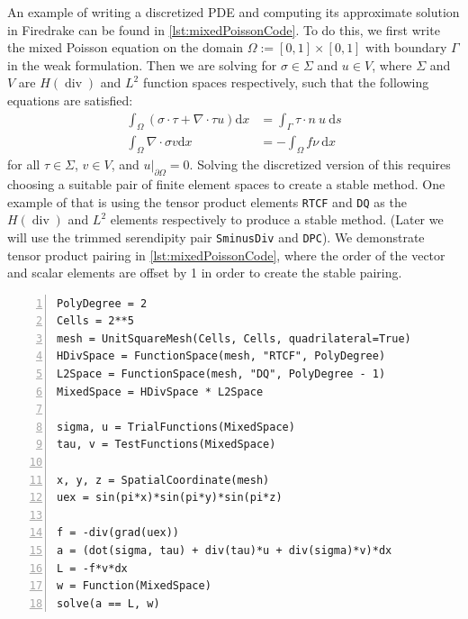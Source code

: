 \documentclass[format=acmsmall,screen,timestamp=false,a4paper]{acmart}
\DeclareMathOperator{\Div}{div}
\newcommand\lm[1]{\textbf{\textcolor[rgb]{1,0,0.5}{[Lawrence: #1]}}}
\newcommand{\hdiv}{\ensuremath{{H}(\Div)}\xspace}
\begin{document}
An example of writing a discretized PDE and computing its approximate solution in Firedrake can be found in \cref{lst:mixedPoissonCode}. To do this, we first write the mixed Poisson equation on the domain $\Omega := [0, 1] \times [0,1]$ with boundary $\Gamma$ in the weak formulation.  Then we are solving for $\sigma \in \Sigma$ and $u \in V$, where $\Sigma$ and $V$ are \hdiv and $L^2$ function spaces respectively, such that the following equations are satisfied:
\begin{equation*}
\begin{aligned}
  \int_\Omega (\sigma \cdot \tau + \nabla \cdot \tau u) \text{d}x &= \int_\Gamma \tau \cdot n~u~\text{d}s\\
  \int_\Omega  \nabla \cdot \sigma v \text{d}x &= - \int_\Omega f \nu~\text{d}x
\end{aligned}
\end{equation*}
for all $\tau \in \Sigma$, $v \in V$, and $u \vert_{\partial \Omega} = 0$. %
Solving the discretized version of this requires choosing a suitable pair of finite element spaces to create a stable method.  One example of that is using the tensor product elements \texttt{RTCF} and \texttt{DQ} as the \hdiv and $L^2$ elements respectively to produce a stable method.  (Later we will use the trimmed serendipity pair \texttt{SminusDiv} and \texttt{DPC}).  We demonstrate tensor product pairing in \cref{lst:mixedPoissonCode}, where the order of the vector and scalar elements are offset by 1 in order to create the stable pairing. 
  
\begin{lstlisting}[float=htpb,caption={Basic Firedrake implementation of the mixed Poisson problem showcasing where to choose the elements that are used and how to create the equations in Firedrake's notation.}, label={lst:mixedPoissonCode}, numbers=left, firstnumber=1, xleftmargin=20pt,  xrightmargin=20pt]
PolyDegree = 2
Cells = 2**5
mesh = UnitSquareMesh(Cells, Cells, quadrilateral=True)
HDivSpace = FunctionSpace(mesh, "RTCF", PolyDegree)
L2Space = FunctionSpace(mesh, "DQ", PolyDegree - 1)
MixedSpace = HDivSpace * L2Space

sigma, u = TrialFunctions(MixedSpace)
tau, v = TestFunctions(MixedSpace)

x, y, z = SpatialCoordinate(mesh)
uex = sin(pi*x)*sin(pi*y)*sin(pi*z)

f = -div(grad(uex))
a = (dot(sigma, tau) + div(tau)*u + div(sigma)*v)*dx
L = -f*v*dx
w = Function(MixedSpace)
solve(a == L, w)
\end{lstlisting}
\end{document}
